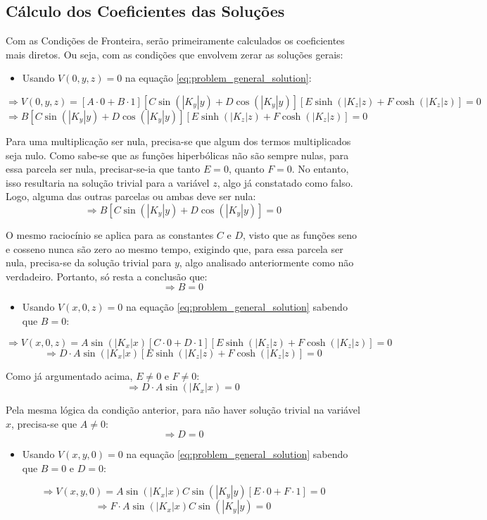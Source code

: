 \documentclass{report}
\begin{document}
\subsection{Cálculo dos Coeficientes das Soluções}

Com as Condições de Fronteira, serão primeiramente calculados os coeficientes mais diretos.
Ou seja, com as condições que envolvem zerar as soluções gerais:

\begin{itemize}
  \item Usando $ V(0, y, z) = 0 $ na equação \ref{eq:problem_general_solution}:
\end{itemize}
$$ \Rightarrow V(0, y, z) = [A \cdot 0 + B \cdot 1][C\sin(|K_y|y) + D\cos(|K_y|y)][E\sinh(|K_z|z) + F\cosh(|K_z|z)] = 0 $$
$$ \Rightarrow B[C\sin(|K_y|y) + D\cos(|K_y|y)][E\sinh(|K_z|z) + F\cosh(|K_z|z)] = 0 $$

Para uma multiplicação ser nula, precisa-se que algum dos termos multiplicados seja nulo. Como sabe-se que
as funções hiperbólicas não são sempre nulas, para essa parcela ser nula, precisar-se-ia que tanto $ E = 0 $, quanto $ F = 0 $.
No entanto, isso resultaria na solução trivial para a variável $ z $, algo já constatado como falso. Logo, alguma
das outras parcelas ou ambas deve ser nula:
$$ \Rightarrow B[C\sin(|K_y|y) + D\cos(|K_y|y)] = 0 $$

O mesmo raciocínio se aplica para as constantes $ C $ e $ D $, visto que as funções seno e cosseno nunca são zero
ao mesmo tempo, exigindo que, para essa parcela ser nula, precisa-se da solução trivial para $ y $, algo analisado
anteriormente como não verdadeiro. Portanto, só resta a conclusão que:
$$ \Rightarrow B = 0 $$

\begin{itemize}
  \item Usando $ V(x, 0, z) = 0 $ na equação \ref{eq:problem_general_solution} sabendo que $ B = 0 $:
\end{itemize}
$$ \Rightarrow V(x, 0, z) = A\sin(|K_x|x)[C\cdot 0 + D\cdot 1][E\sinh(|K_z|z) + F\cosh(|K_z|z)] = 0 $$
$$ \Rightarrow D\cdot A\sin(|K_x|x)[E\sinh(|K_z|z) + F\cosh(|K_z|z)] = 0 $$

Como já argumentado acima, $ E \neq 0 $ e $ F \neq 0 $:
$$ \Rightarrow D\cdot A\sin(|K_x|x) = 0 $$

Pela mesma lógica da condição anterior, para não haver solução trivial na variável $ x $, precisa-se que $ A \neq 0 $:
$$ \Rightarrow D = 0 $$

\begin{itemize}
  \item Usando $ V(x, y, 0) = 0 $ na equação \ref{eq:problem_general_solution} sabendo que $ B = 0 $ e $ D = 0 $:
\end{itemize}
$$ \Rightarrow V(x, y, 0) = A\sin(|K_x|x)C\sin(|K_y|y)[E\cdot 0 + F\cdot 1] = 0 $$
$$ \Rightarrow F\cdot A\sin(|K_x|x)C\sin(|K_y|y) = 0 $$
\end{document}

